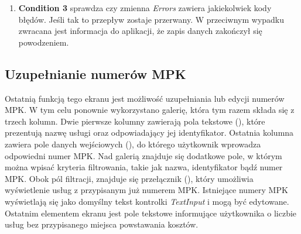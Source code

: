 \begin{enumerate}
\begin{itemize}
              \item \textbf{Filter out null IDs} -- odfiltrowuje elementy, które nie mają przypisanego identyfikatora SharePoint. Gdyby nie ten krok, próba aktualizacji rekordu bez identyfikatora zakończyłaby się błędem.
              \item  \textbf{Replace Template Data} -- wstawia wybrane informacje do szablonu żądania HTTP.
              \item \textbf{batchData} -- w kroku tym, znaki specjalne są zakodowane procentowo\footnote{\emph{Kodowanie procentowe} -- metoda reprezentowania znaków specjalnych w adresach URL w formie zgodnej z protokołem HTTP. Polega na zastępowaniu niebezpiecznych lub niedozwolonych znaków ich odpowiednikami w postaci procentowego kodu, który składa się z symbolu "\%" i dwóch cyfr szesnastkowych reprezentujących kod ASCII danego znaku.} (znane również jako \emph{kodowanie URL}). Jest to wymagane aby uniknąć błędów.
              \item \textbf{Send Batch Request} -- wysyła żądanie aktualizacji danych do SharePoint.
              \item \textbf{Assign result of send batch data to Error var} -- przypisuje odpowiedź serwera na wysłane żądanie w celu późniejszej analizy.
          \end{itemize}

    \item \textbf{Condition 3} sprawdza czy zmienna \emph{Errors} zawiera jakiekolwiek kody błędów. Jeśli tak to przepływ zostaje przerwany. W przeciwnym wypadku zwracana jest informacja do aplikacji, że zapis danych zakończył się powodzeniem.
\end{enumerate}

\subsection{Uzupełnianie numerów MPK}
Ostatnią funkcją tego ekranu jest możliwość uzupełniania lub edycji numerów MPK. W tym celu ponownie wykorzystano galerię, która tym razem składa się z trzech kolumn. Dwie pierwsze kolumny zawierają pola tekstowe (), które prezentują nazwę usługi oraz odpowiadający jej identyfikator. Ostatnia kolumna zawiera pole danych wejściowych (), do którego użytkownik wprowadza odpowiedni numer MPK. Nad galerią znajduje się dodatkowe pole, w którym można wpisać kryteria filtrowania, takie jak nazwa, identyfikator bądź numer MPK. Obok pól filtracji, znajduje się przełącznik (), który umożliwia wyświetlenie usług z przypisanym już numerem MPK. Istniejące numery MPK wyświetlają się jako domyślny tekst kontrolki \emph{TextInput} i mogą być edytowane. Ostatnim elementem ekranu jest pole tekstowe informujące użytkownika o liczbie usług bez przypisanego miejsca powstawania kosztów.
